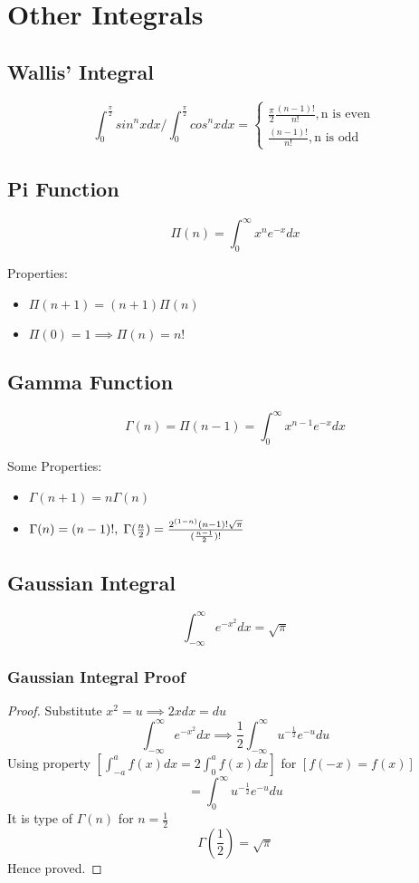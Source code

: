 \documentclass[twocolumn, 10pt]{article}
\begin{document}
\section{Other Integrals}
\subsection{Wallis' Integral}
$$\int_{0}^{\frac{\pi}{2}} sin^{n}xdx/\int_{0}^{\frac{\pi}{2}} cos^{n}xdx=
\begin{cases}
  \frac{\pi}{2}\frac{(n-1)!}{n!}, \text{n is even}\ \\
  
  \frac{(n-1)!}{n!},\text{n is odd}\
\end{cases} $$
\subsection{Pi Function}
$$\Pi(n)= \int_{0}^{\infty}x^{n}e^{-x}dx$$

Properties:
\begin{itemize}
\item $\Pi(n+1)=(n+1) \Pi(n)$
\item $\Pi(0)=1 \implies \Pi(n)=n!$
\end{itemize}
\subsection{Gamma Function}
$$\Gamma(n)=\Pi(n-1)= \int_{0}^{\infty}x^{n-1}e^{-x}dx$$

Some Properties:
\begin{itemize}
\item $\Gamma(n+1)=n \Gamma(n)$
\item $\Gamma(n)=(n-1)!, \thickspace \Gamma(\frac{n}{2})=\frac{2^{(1-n)} (n-1)!\sqrt{\pi}}{(\frac{n-1}{2})!}$
\end{itemize}
\subsection{Gaussian Integral}
$$\int_{-\infty}^{\infty}e^{-x^{2}}dx=\sqrt{\pi}$$
\subsubsection{Gaussian Integral Proof}
\begin{proof}
Substitute $x^2=u \implies 2xdx=du$ \\
$$\int_{-\infty}^{\infty}e^{-x^{2}}dx \implies \frac{1}{2}\int_{-\infty}^{\infty} u^{-\frac{1}{2}}e^{-u}du$$
Using property $[\int_{-a}^{a}f(x)dx=2 \int_{0}^{a}f(x)dx]$ for $[f(-x)=f(x)]$ \\
$$=\int_{0}^{\infty} u^{-\frac{1}{2}}e^{-u}du$$
It is type of $\Gamma(n)$ for $n=\frac{1}{2}$
$$\Gamma(\frac{1}{2})=\sqrt{\pi}$$
Hence proved.
\end{proof}
\end{document}

